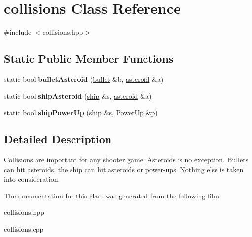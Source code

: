 \hypertarget{classcollisions}{}\section{collisions Class Reference}
\label{classcollisions}


{\ttfamily \#include $<$collisions.\+hpp$>$}

\subsection*{Static Public Member Functions}
\begin{DoxyCompactItemize}
\item 
\mbox{\label{classcollisions_a8987dc3e5ab1cccd32e278858417507d}} 
static bool {\bfseries bullet\+Asteroid} (\hyperlink{classbullet}{bullet} \&b, \hyperlink{classasteroid}{asteroid} \&a)
\item 
\mbox{\label{classcollisions_aed257635c14b6ada7c28ec73f4ca76ac}} 
static bool {\bfseries ship\+Asteroid} (\hyperlink{classship}{ship} \&s, \hyperlink{classasteroid}{asteroid} \&a)
\item 
\mbox{\label{classcollisions_aaecc9900192881314d8ca8fbf65826c6}} 
static bool {\bfseries ship\+Power\+Up} (\hyperlink{classship}{ship} \&s, \hyperlink{class_power_up}{Power\+Up} \&p)
\end{DoxyCompactItemize}


\subsection{Detailed Description}
Collisions are important for any shooter game. Asteroids is no exception. Bullets can hit asteroids, the ship can hit asteroids or power-\/ups. Nothing else is taken into consideration. 

The documentation for this class was generated from the following files\+:\begin{DoxyCompactItemize}
\item 
collisions.\+hpp\item 
collisions.\+cpp\end{DoxyCompactItemize}
